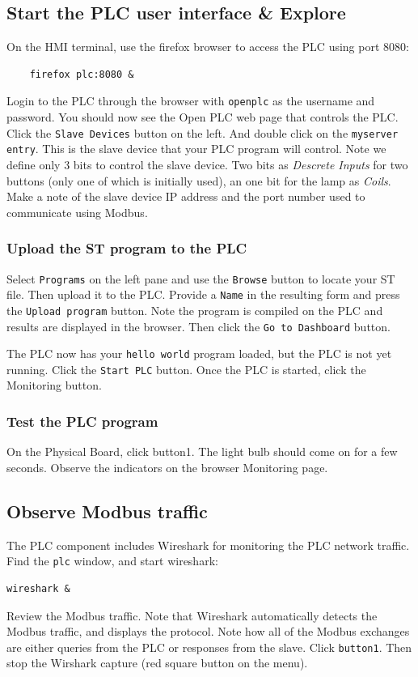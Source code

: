 \subsection{Start the PLC user interface \& Explore}
On the HMI terminal, use the firefox browser to access the PLC using port 8080:
\begin{verbatim}
    firefox plc:8080 &
\end{verbatim}
\noindent Login to the PLC through the browser with {\tt openplc} as the username and password.  
You should now see the Open PLC web page that controls the PLC.  Click the {\tt Slave Devices} button
on the left.  And double click on the {\tt myserver entry}.  This is the slave device that your PLC program will control.
Note we define only 3 bits to control the slave device.  Two bits as \textit{Descrete Inputs} for two buttons (only one 
of which is initially used), an one bit for the lamp as \textit{Coils}.
Make a note of the slave device IP address and  the port number used to communicate using Modbus.

\subsubsection{Upload the ST program to the PLC}
Select {\tt Programs} on the left pane and use the
{\tt Browse} button to locate your ST file.  Then upload it to the PLC.  Provide a {\tt Name} in the resulting form
and press the {\tt Upload program} button.  Note the program is compiled on the PLC and results are displayed in
the browser.  Then click the {\tt Go to Dashboard} button.

The PLC now has your {\tt hello world} program loaded, but the PLC is not yet running.
Click the {\tt Start PLC} button.  Once the PLC is started, click the Monitoring button.

\subsubsection{Test the PLC program}
On the Physical Board, click button1.  The light bulb should come on for a few seconds.  Observe the indicators on the browser
Monitoring page.  

\subsection{Observe Modbus traffic}
The PLC component includes Wireshark for monitoring the PLC network traffic.
Find the {\tt plc} window, and start wireshark:
\begin{verbatim}
wireshark &
\end{verbatim}
\noindent Review the Modbus traffic.  Note that Wireshark automatically detects the Modbus traffic, and displays the protocol.
Note how all of the Modbus exchanges are either queries from the PLC or responses from the slave.
Click {\tt button1}.  Then stop the Wirshark capture (red square button on the menu). 

